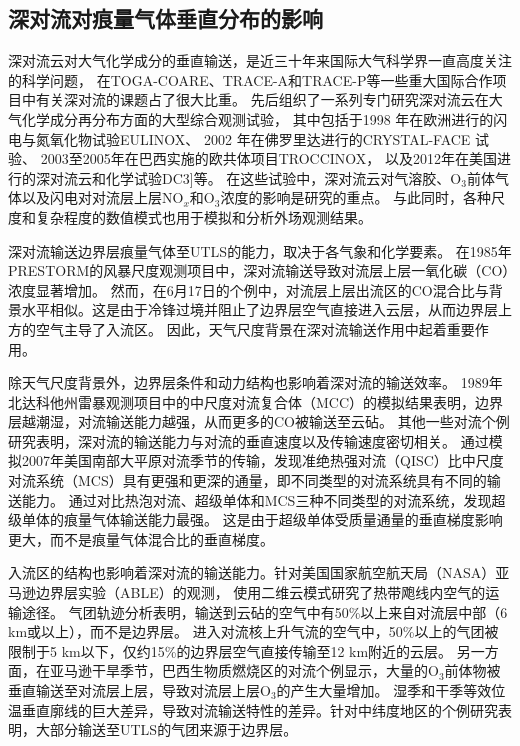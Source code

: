 \subsection{深对流对痕量气体垂直分布的影响}

深对流云对大气化学成分的垂直输送，是近三十年来国际大气科学界一直高度关注的科学问题，
在TOGA-COARE\citep{Webster.1992}、TRACE-A\citep{Fishman.1996}和TRACE-P\citep{Jacob.2003}等一些重大国际合作项目中有关深对流的课题占了很大比重。
先后组织了一系列专门研究深对流云在大气化学成分再分布方面的大型综合观测试验，
其中包括于1998 年在欧洲进行的闪电与氮氧化物试验EULINOX\citep{Holler.2000}、
2002 年在佛罗里达进行的CRYSTAL-FACE 试验\citep{Toon.2003}、
2003至2005年在巴西实施的欧共体项目TROCCINOX\citep{Huntrieser.2008}，
以及2012年在美国进行的深对流云和化学试验DC3\citep{Barth.2019}]等。
在这些试验中，深对流云对气溶胶、O$_3$前体气体以及闪电对对流层上层NO$_x$和O$_3$浓度的影响是研究的重点。
与此同时，各种尺度和复杂程度的数值模式也用于模拟和分析外场观测结果。

深对流输送边界层痕量气体至UTLS的能力，取决于各气象和化学要素。
在1985年PRESTORM的风暴尺度观测项目中，深对流输送导致对流层上层一氧化碳（CO）浓度显著增加\citep{Dickerson.1987,Pickering.1989}。
然而，在6月17日的个例中，对流层上层出流区的CO混合比与背景水平相似。这是由于冷锋过境并阻止了边界层空气直接进入云层，从而边界层上方的空气主导了入流区\citep{Pickering.1988}。
因此，天气尺度背景在深对流输送作用中起着重要作用。

除天气尺度背景外，边界层条件和动力结构也影响着深对流的输送效率。
1989年北达科他州雷暴观测项目中的中尺度对流复合体（MCC）的模拟结果表明，边界层越潮湿，对流输送能力越强，从而更多的CO被输送至云砧\citep{Stenchikov.1996}。
其他一些对流个例研究表明，深对流的输送能力与对流的垂直速度以及传输速度密切相关\citep{Pickering.1992a,Wang.1996}。
\citet{Bigelbach.2014}通过模拟2007年美国南部大平原对流季节的传输，发现准绝热强对流（QISC）比中尺度对流系统（MCS）具有更强和更深的通量，即不同类型的对流系统具有不同的输送能力。
\citet{Li.2017b}通过对比热泡对流、超级单体和MCS三种不同类型的对流系统，发现超级单体的痕量气体输送能力最强。
这是由于超级单体受质量通量的垂直梯度影响更大，而不是痕量气体混合比的垂直梯度。

入流区的结构也影响着深对流的输送能力。针对美国国家航空航天局（NASA）亚马逊边界层实验（ABLE）的观测，
\citet{Scala.1990}使用二维云模式研究了热带飑线内空气的运输途径。
气团轨迹分析表明，输送到云砧的空气中有50\%以上来自对流层中部（6 km或以上），而不是边界层。
进入对流核上升气流的空气中，50\%以上的气团被限制于5 km以下，仅约15\%的边界层空气直接传输至12 km附近的云层。
另一方面，在亚马逊干旱季节，巴西生物质燃烧区的对流个例显示，大量的O$_3$前体物被垂直输送至对流层上层，导致对流层上层O$_3$的产生大量增加\citep{Pickering.1992,Pickering.1992a,Pickering.1996}。
湿季和干季等效位温垂直廓线的巨大差异，导致对流输送特性的差异。针对中纬度地区的个例研究表明，大部分输送至UTLS的气团来源于边界层\citep{Mullendore.2005,Skamarock.2000}。


